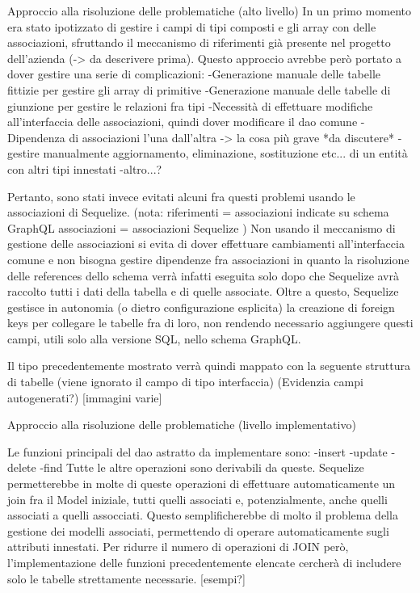     Approccio alla risoluzione delle problematiche (alto livello)
        In un primo momento era stato ipotizzato di gestire i campi di tipi composti e gli array con delle associazioni, sfruttando il meccanismo di riferimenti già presente nel progetto dell'azienda (-> da descrivere prima).
        Questo approccio avrebbe però portato a dover gestire una serie di complicazioni:
            -Generazione manuale delle tabelle fittizie per gestire gli array di primitive
            -Generazione manuale delle tabelle di giunzione per gestire le relazioni fra tipi
            -Necessità di effettuare modifiche all'interfaccia delle associazioni, quindi dover modificare il dao comune
            -Dipendenza di associazioni l'una dall'altra -> la cosa più grave *da discutere*
            -gestire manualmente aggiornamento, eliminazione, sostituzione etc... di un entità con altri tipi innestati
            -altro...?
        
        Pertanto, sono stati invece evitati alcuni fra questi problemi usando le associazioni di Sequelize.
        (nota: riferimenti = associazioni indicate su schema GraphQL
               associazioni = associazioni Sequelize
        )
        Non usando il meccanismo di gestione delle associazioni si evita di dover effettuare cambiamenti all'interfaccia comune e non bisogna gestire dipendenze fra associazioni in quanto la risoluzione delle references dello schema verrà infatti eseguita solo dopo che Sequelize avrà raccolto tutti i dati della tabella e di quelle associate.
        Oltre a questo, Sequelize gestisce in autonomia (o dietro configurazione esplicita) la creazione di foreign keys per collegare le tabelle fra di loro, non rendendo necessario aggiungere questi campi, utili solo alla versione SQL, nello schema GraphQL.

        Il tipo precedentemente mostrato verrà quindi mappato con la seguente struttura di tabelle (viene ignorato il campo di tipo interfaccia) (Evidenzia campi autogenerati?)
        [immagini varie]

    Approccio alla risoluzione delle problematiche (livello implementativo)

        Le funzioni principali del dao astratto da implementare sono:
            -insert
            -update
            -delete
            -find
        Tutte le altre operazioni sono derivabili da queste.
        Sequelize permetterebbe in molte di queste operazioni di effettuare automaticamente un join fra il Model iniziale, tutti quelli associati e, potenzialmente, anche quelli associati a quelli assocciati.
        Questo semplificherebbe di molto il problema della gestione dei modelli associati, permettendo di operare automaticamente sugli attributi innestati.
        Per ridurre il numero di operazioni di JOIN però, l'implementazione delle funzioni precedentemente elencate cercherà di includere solo le tabelle strettamente necessarie.
        [esempi?]

